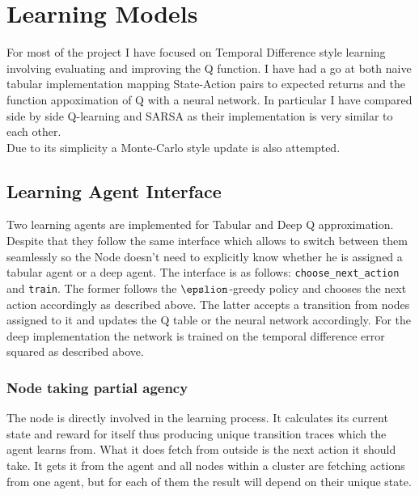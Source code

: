 
\section{Learning Models}

For most of the project I have focused on Temporal Difference
style learning involving evaluating and improving the Q
function. I have had a go at both naive tabular implementation
mapping State-Action pairs to expected returns and the 
function appoximation of Q with a neural network. 
In particular I have compared side by side Q-learning and SARSA
as their implementation is very similar to each other. \\

Due to its simplicity a Monte-Carlo style update is also 
attempted.
 
\subsection{Learning Agent Interface}
Two learning agents are implemented for Tabular and Deep Q approximation. Despite that they follow the same interface
which allows to switch between them seamlessly so the Node
doesn't need to explicitly know whether he is assigned a 
tabular agent or a deep agent. The interface is as follows:
\texttt{choose\_next\_action} and \texttt{train}. The former 
follows the $\epslion$-greedy policy and chooses the next 
action accordingly as described above. The latter accepts
a transition from nodes assigned to it and updates the Q table
or the neural network accordingly. For the deep implementation
the network is trained on the temporal difference error squared
as described above. \\

\subsubsection{Node taking partial agency}

The node is directly involved in the learning process. 
It calculates its current state and reward for itself thus
producing  unique transition traces which the agent learns from. 
What it does fetch from outside is the next action it should
take. It gets it from the agent and all nodes within a cluster
are fetching actions from one agent, but for each of them
the result will depend on their unique state.\\

